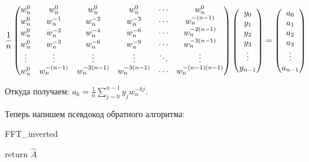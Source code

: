 \[
  \frac{1}{n}
  \begin{pmatrix}
    w_n^0 & w_n^0 & w_n^0 & w_n^0 & \cdots & w_n^0 \cr 
    w_n^0 & w_n^{-1} & w_n^{-2} & w_n^{-3} & \cdots & w_n^{-(n-1)} \cr 
    w_n^0 & w_n^{-2} & w_n^{-4} & w_n^{-6} & \cdots & w_n^{-2(n-1)} \cr 
    w_n^0 & w_n^{-3} & w_n^{-6} & w_n^{-9} & \cdots & w_n^{-3(n-1)} \cr 
    \vdots & \vdots & \vdots & \vdots & \ddots & \vdots \cr 
    w_n^0 & w_n^{-(n-1)} & w_n^{-2(n-1)} & w_n^{-3(n-1)} & \cdots & w_n^{-(n-1)(n-1)}
  \end{pmatrix}
  \begin{pmatrix}
    y_0 \cr 
    y_1 \cr 
    y_2 \cr 
    y_3 \cr 
    \vdots \cr 
    y_{n-1}
  \end{pmatrix}
  =
  \begin{pmatrix}
    a_0 \cr 
    a_1 \cr 
    a_2 \cr 
    a_3 \cr 
    \vdots \cr 
    a_{n-1}
  \end{pmatrix}
\]

Откуда получаем: $a_k = \frac{1}{n}\sum\limits_{j = 0}^{n - 1} y_jw_n^{-kj}$.

Теперь напишем псевдокод обратного алгоритма:

\begin{algorithm}[H]
  \caption{FFT\_inverted}
  \begin{algorithmic}[1]
     
    \EndIf
       
       
    \EndFor
    \State return $\hat A$
    \EndFunction
  \end{algorithmic}
\end{algorithm}
\newpage

% 
